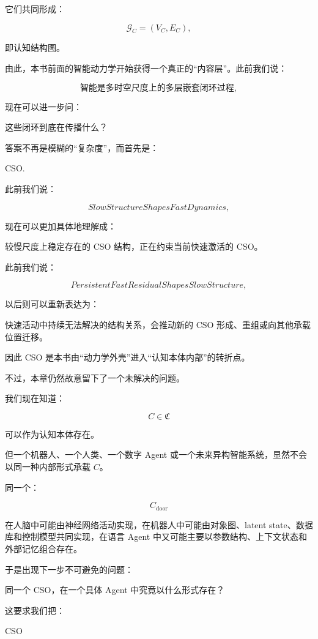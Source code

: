 它们共同形成：

\[
\boxed{
\mathcal G_C
=
(V_C,E_C),
}
\]

即认知结构图。

由此，本书前面的智能动力学开始获得一个真正的“内容层”。此前我们说：

\[
\text{智能是多时空尺度上的多层嵌套闭环过程},
\]

现在可以进一步问：

这些闭环到底在传播什么？

答案不再是模糊的“复杂度”，而首先是：

\begin{statementbox}
CSO.
\end{statementbox}

此前我们说：

\[
SlowStructureShapesFastDynamics,
\]

现在可以更加具体地理解成：

较慢尺度上稳定存在的 CSO 结构，正在约束当前快速激活的 CSO。

此前我们说：

\[
PersistentFastResidualShapesSlowStructure,
\]

以后则可以重新表达为：

快速活动中持续无法解决的结构关系，会推动新的 CSO 形成、重组或向其他承载位置迁移。

因此 CSO 是本书由“动力学外壳”进入“认知本体内部”的转折点。

不过，本章仍然故意留下了一个未解决的问题。

我们现在知道：

\[
C\in\mathfrak C
\]

可以作为认知本体存在。

但一个机器人、一个人类、一个数字 Agent 或一个未来异构智能系统，显然不会以同一种内部形式承载 \(C\)。

同一个：

\[
C_{\mathrm{door}}
\]

在人脑中可能由神经网络活动实现，在机器人中可能由对象图、latent state、数据库和控制模型共同实现，在语言 Agent 中又可能主要以参数结构、上下文状态和外部记忆组合存在。

于是出现下一步不可避免的问题：

\begin{statementbox}
同一个 CSO，在一个具体 Agent 中究竟以什么形式存在？
\end{statementbox}

这要求我们把：

\begin{statementbox}
CSO
\end{statementbox}

